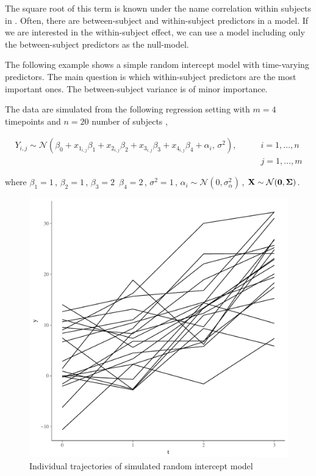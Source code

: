 \documentclass[11pt,a4paper,twoside]{book}
\makeatletter
\def\maxwidth{ %
  \ifdim\Gin@nat@width>\linewidth
    \linewidth
  \else
    \Gin@nat@width
  \fi
}
\newenvironment{knitrout}{}{} %
\makeatother
\begin{document}
The square root of this term is known under the name correlation within subjects in \cite{Bland1995}. Often, there are between-subject and within-subject predictors in a model. If we are interested in the within-subject effect, we can use a model including only the between-subject predictors as the null-model.

The following example shows a simple random intercept model with time-varying predictors. The main question is which within-subject predictors are the most important ones. The between-subject variance is of minor importance. 

The data are simulated from the following regression setting with $m = 4$ timepoints and $n = 20$ number of subjects ,

\begin{align*} 
Y_{i,j} \sim \mathcal{N}(\beta_{0}+x_{1_{i,j}} \beta_{1}+x_{2_{i,j}} \beta_{2}+x_{3_{i,j}} \beta_{3}+x_{4_{i,j}} \beta_{4} + \alpha_{i}, \, \sigma^2), \qquad &i = 1, \dots, n \\  &j = 1, \dots, m
\end{align*} 

where $\beta_{1} = 1 \,$,  $\beta_{2} = 1 \,$,   $\beta_{3} = 2 \,$  $\beta_{4}=2 \,$, $\sigma^2 = 1 \, $, $\alpha_{i} \sim \mathcal{N}(0, \sigma_{\alpha}^2) \,$, ${\mathbf{X}} \sim \mathcal{N}({\mathbf{0}}, {\boldsymbol{\Sigma}}{})$.



\begin{knitrout}
\color{fgcolor}\begin{figure}
\includegraphics[width=\maxwidth]{figure/ch04_fig_repeated_plot_ri-1} \caption[Individual trajectories of simulated random intercept model]{Individual trajectories of simulated random intercept model}\label{fig:.repeated.plot.ri}
\end{figure}


\end{knitrout}
\end{document}
